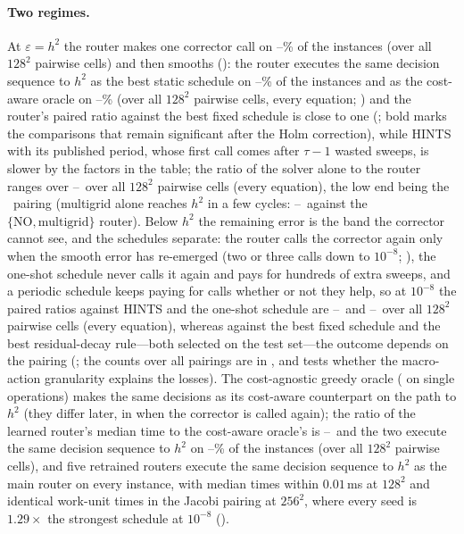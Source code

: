 \paragraph{Two regimes.} At $\varepsilon = h^2$ the router makes one corrector call on \caOneCallMin--\caOneCallMax\% of the instances (over all $128^2$ pairwise cells) and then smooths (): the router executes the same decision sequence to $h^2$ as the best static schedule on \caAgreeBestMin--\caAgreeBestMax\% of the instances and as the cost-aware oracle on \caAgreeOracleMin--\caAgreeOracleMax\% (over all $128^2$ pairwise cells, every equation; ) and the router's paired ratio against the best fixed schedule is close to one (; bold marks the comparisons that remain significant after the Holm correction), while HINTS with its published period, whose first call comes after $\tau - 1$ wasted sweeps, is slower by the factors in the table; the ratio of the solver alone to the router ranges over \caSpSolverMin--\caSpSolverMax\ over all $128^2$ pairwise cells (every equation), the low end being the \caSpSolverMinPairing\ pairing (multigrid alone reaches $h^2$ in a few cycles: \caVsMgEnsAllMin--\caVsMgEnsAllMax\ against the $\{\mathrm{NO}, \text{multigrid}\}$ router). Below $h^2$ the remaining error is the band the corrector cannot see, and the schedules separate: the router calls the corrector again only when the smooth error has re-emerged (two or three calls down to $10^{-8}$; ), the one-shot schedule never calls it again and pays for hundreds of extra sweeps, and a periodic schedule keeps paying for calls whether or not they help, so at $10^{-8}$ the paired ratios against HINTS and the one-shot schedule are \caSpHintsDeepMin--\caSpHintsDeepMax\ and \caSpOneshotDeepMin--\caSpOneshotDeepMax\ over all $128^2$ pairwise cells (every equation), whereas against the best fixed schedule and the best residual-decay rule---both selected on the test set---the outcome depends on the pairing (; the counts over all pairings are in , and  tests whether the macro-action granularity explains the losses). The cost-agnostic greedy oracle ( on single operations) makes the same decisions as its cost-aware counterpart on the path to $h^2$ (they differ later, in when the corrector is called again); the ratio of the learned router's median time to the cost-aware oracle's is \caSpOracleRatioMin--\caSpOracleRatioMax\ and the two execute the same decision sequence to $h^2$ on \caAgreeOracleMin--\caAgreeOracleMax\% of the instances (over all $128^2$ pairwise cells), and five retrained routers execute the same decision sequence to $h^2$ as the main router on every instance, with median times within $0.01$\,ms at $128^2$ and identical work-unit times in the Jacobi pairing at $256^2$, where every seed is $1.29\times$ the strongest schedule at $10^{-8}$ ().

